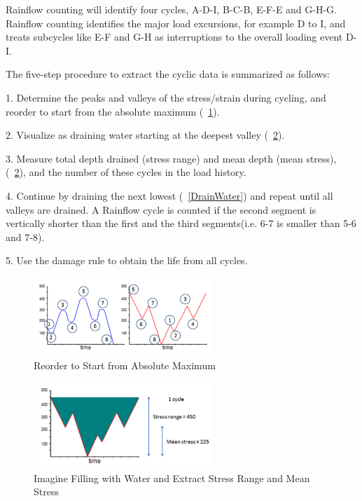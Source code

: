 \documentclass[3p,times,procedia,number]{elsarticle}
\newcommand{\figref}[1]{\figurename~\ref{#1}}
\begin{document}
Rainflow counting will identify four cycles, A-D-I, B-C-B, E-F-E and G-H-G. Rainflow counting identifies the major load excursions, for example D to I, and treats subcycles like E-F and G-H as interruptions to the overall loading event D-I.

\vspace{6pt}
The five-step procedure to extract the cyclic data is summarized as follows:

1.  Determine the peaks and valleys of the stress/strain during cycling, and reorder to start from the absolute maximum (\figref{Reorder}).

2.  Visualize as draining water starting at the deepest valley (\figref{StressRange}).

3.  Measure total depth drained (stress range) and mean depth (mean stress), (\figref{StressRange}), and the number of these cycles in the load history.

4.  Continue by draining the next lowest (\figref{DrainWater}) and repeat until all valleys are drained. A  Rainflow  cycle is counted if the second segment is vertically shorter than the first and the third segments(i.e. 6-7 is smaller than 5-6 and 7-8).

5.  Use the damage rule to obtain the life from all cycles.

\begin{figure}[h!]
	\centering
	\includegraphics[width=0.6\textwidth]{figures//Reorder.png} 
	\caption{Reorder to Start from Absolute Maximum}
	\label{Reorder}
\end{figure}

\begin{figure}[h!]
	\centering
	\includegraphics[width=0.6\textwidth]{figures//StressRange.png} 
	\caption{Imagine Filling with Water and Extract Stress Range and Mean Stress}
	\label{StressRange}
\end{figure}
\end{document}
